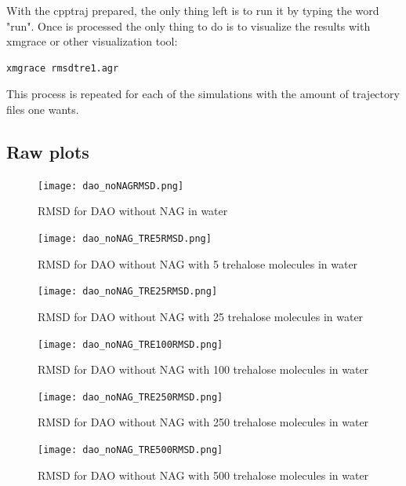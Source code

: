 \documentclass[a4paper]{article}
\begin{document}
With the cpptraj prepared, the only thing left is to run it by typing the word "run". Once is processed the only thing to do is to visualize the results with xmgrace or other visualization tool:

\begin{lstlisting}[language=Bash,caption={Visualization}]
    xmgrace rmsdtre1.agr
\end{lstlisting}

This process is repeated for each of the simulations with the amount of trajectory files one wants. 

\subsection{Raw plots}

\begin{figure}[htbp]
    \centering
    \texttt{[image: dao\_noNAGRMSD.png]}
    \caption{RMSD for DAO without NAG in water}
    \label{Fig:rmsdDAOnoNAG}
\end{figure}

\begin{figure}[htbp]
    \centering
    \texttt{[image: dao\_noNAG\_TRE5RMSD.png]}
    \caption{RMSD for DAO without NAG with 5 trehalose molecules in water}
    \label{Fig:rmsdDAOnoNAG}
\end{figure}

\begin{figure}[htbp]
    \centering
    \texttt{[image: dao\_noNAG\_TRE25RMSD.png]}
    \caption{RMSD for DAO without NAG with 25 trehalose molecules in water}
    \label{Fig:rmsdDAOnoNAG}
\end{figure}

\begin{figure}[htbp]
    \centering
    \texttt{[image: dao\_noNAG\_TRE100RMSD.png]}
    \caption{RMSD for DAO without NAG with 100 trehalose molecules in water}
    \label{Fig:rmsdDAOnoNAG}
\end{figure}

\begin{figure}[htbp]
    \centering
    \texttt{[image: dao\_noNAG\_TRE250RMSD.png]}
    \caption{RMSD for DAO without NAG with 250 trehalose molecules in water}
    \label{Fig:rmsdDAOnoNAG}
\end{figure}

\begin{figure}[htbp]
    \centering
    \texttt{[image: dao\_noNAG\_TRE500RMSD.png]}
    \caption{RMSD for DAO without NAG with 500 trehalose molecules in water}
    \label{Fig:rmsdDAOnoNAG}
\end{figure}
\end{document}

